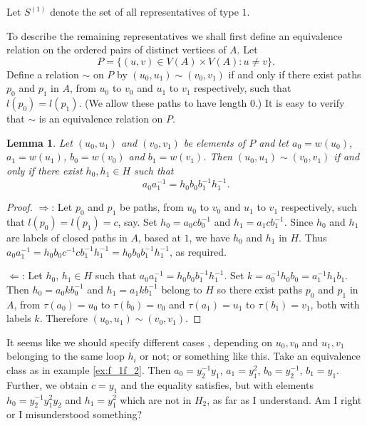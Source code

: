 \documentclass[a4paper,12pt]{article}
\renewcommand{\t}{\tau }
\newtheorem{lemma}[theorem]{Lemma}
\numberwithin{equation}{section}
\numberwithin{figure}{section}
\begin{document}
Let $S^{(1)}$ denote the set of all representatives of type $1$.

To describe the remaining representatives we shall first define an equivalence
relation on the ordered pairs of distinct vertices of $A$. Let
\[P=\{(u,v)\in V(A)\times V(A): u\neq v\}.\]
Define a relation $\sim$ on $P$ by $(u_0,u_1)\sim (v_0,v_1)$ if and only if
there exist paths $p_0$ and $p_1$ in $A$, from $u_0$ to $v_0$ and $u_1$ to $v_1$
respectively, such that $l(p_0)=l(p_1)$. (We allow these paths to have length $0$.)
It is easy to verify that $\sim$ is an equivalence relation on $P$.

\begin{lemma}\label{lem:equiv_verts}
Let $(u_0,u_1)$ and $(v_0,v_1)$ be elements of $P$ and let
$a_0=w(u_0)$, $a_1=w(u_1)$, $b_0=w(v_0)$ and $b_1=w(v_1)$. Then
$(u_0,u_1)\sim (v_0,v_1)$ if and only if there exist $h_0,h_1\in H$ such that
\[a_0a_1^{-1}=h_0b_0b_1^{-1}h_1^{-1}.\]
\end{lemma}
\begin{proof}
$\Rightarrow$: Let $p_0$ and $p_1$ be paths, from $u_0$ to $v_0$ and $u_1$ to $v_1$
respectively, such that $l(p_0)=l(p_1)=c$, say. Set $h_0=a_0cb_0^{-1}$ and
$h_1=a_1cb_1^{-1}$. Since $h_0$ and $h_1$ are labels of closed paths in $A$, based at $1$, we
have $h_0$ and $h_1$ in $H$. Thus
$a_0a_1^{-1}=h_0b_0c^{-1}cb_1^{-1}h_1^{-1}=h_0b_0b_1^{-1}h_1^{-1}$, as required.

$\Leftarrow$: Let $h_0$, $h_1 \in H$ such that $a_0a_1^{-1}=h_0b_0b_1^{-1}h_1^{-1}$.
Set $k=a_0^{-1}h_0b_0=a_1^{-1}h_1b_1$. Then $h_0=a_0kb_0^{-1}$ and $h_1=a_1kb_1^{-1}$
belong to $H$ so there exist paths $p_0$ and $p_1$ in $A$,
from $\t(a_0)=u_0$ to $\t(b_0)=v_0$ and
$\t(a_1)=u_1$ to $\t(b_1)=v_1$, both with labels $k$.
Therefore $(u_0,u_1)\sim (v_0,v_1)$.
\end{proof}
{\ef
It seems like we should specify different cases , depending on
$u_0, v_0$ and $u_1,v_1$ belonging to the same loop $h_i$ or not;
or something like this. Take an equivalence class as in example
\ref{ex:f_1f_2}. Then $a_0 = y_2^{-1}y_1$, $a_1 = y_1^2$, $b_0 =
y_2^{-1}$, $b_1=y_1$. Further, we obtain $c = y_1$ and the
equality satisfies, but with elements $h_0 = y_2^{-1} y_1^2 y_2$
and $h_1 = y_1^2$ which are not in $H_2$, as far as I understand.
Am I right or I misunderstood something?
}
\end{document}

